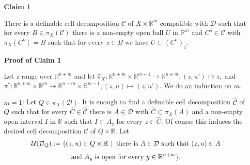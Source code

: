 \documentclass[12pt]{article}
\def\vs{\vspace}
\def\ma{\mathcal}
\begin{document}

\vs{0.3cm}
{\bf Claim 1}

\vs{0.1cm}
There is a definable cell decomposition $\mathcal{C}$ of $X \times \mathbb{R}^m$ compatible with $\mathcal{D}$ such that for every $B \in \pi_X(\mathcal{C})$ there is a non-empty open ball $U$ in $\mathbb{R}^m$ and $C^o \in \mathcal{C}$ with $\pi_X(C^o)=B$ such that for every $z \in B$ we have $U \subset (C^o)_z$.

\vs{0.4cm}
{\bf Proof of Claim 1}

\vs{0.1cm}
Let $z$ range over $\mathbb{R}^{n+m}$ and let $\hat{\pi}_X:\mathbb{R}^{n+m} \times \mathbb{R}^{m-1} \to \mathbb{R}^{n+m}, (z,u') \mapsto z,$ and $\pi^*: \mathbb{R}^{n+m} \times \mathbb{R}^m \to \mathbb{R}^{n+m}  \times \mathbb{R}^{m-1}, (z,u) \mapsto (z,u')$. We do an induction on $m$. 

\vs{0.2cm}
$m=1$: Let $Q \in \pi_X(\mathcal{D})$. It is enough to find a definable cell decomposition $\hat{\mathcal{C}}$ of $Q$ such that for every $\hat{C} \in \hat{\mathcal{C}}$ there is $A \in \mathcal{D}$ with $\hat{C} \subset \pi_X(A)$ and a non-empty open interval $I$ in $\mathbb{R}$ such that $I \subset A_z$ for every $z \in \hat{C}$. Of course this induces the desired cell decomposition $\mathcal{C}$ of $Q \times \mathbb{R}$. Let 
$$\mathcal{U}(\mathcal{D}_Q):=\{(z,u) \in Q \times \mathbb{R} \mid \textnormal{ there is $A \in \mathcal{D}$ such that $(z,u) \in A$}$$
$$\textnormal{and $A_y$ is open for every $y \in \mathbb{R}^{n+m}$}\}.$$
\end{document}

